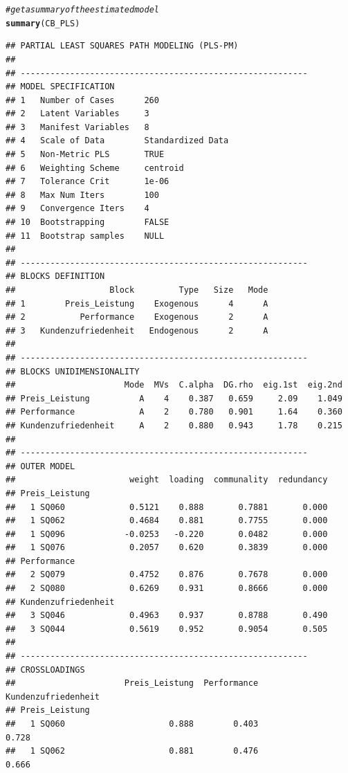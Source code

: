 \documentclass{article}\usepackage[]{graphicx}\usepackage[]{color}
\makeatletter
\newcommand{\hlcom}[1]{\textcolor[rgb]{0.678,0.584,0.686}{\textit{#1}}}%
\newcommand{\hlstd}[1]{\textcolor[rgb]{0.345,0.345,0.345}{#1}}%
\newcommand{\hlkwd}[1]{\textcolor[rgb]{0.737,0.353,0.396}{\textbf{#1}}}%
\newenvironment{kframe}{%
 \def\at@end@of@kframe{}%
 \ifinner\ifhmode%
  \def\at@end@of@kframe{\end{minipage}}%
  \begin{minipage}{\columnwidth}%
 \fi\fi%
 \def\FrameCommand##1{\hskip\@totalleftmargin \hskip-\fboxsep
 \colorbox{shadecolor}{##1}\hskip-\fboxsep
     \hskip-\linewidth \hskip-\@totalleftmargin \hskip\columnwidth}%
 \MakeFramed {\advance\hsize-\width
   \@totalleftmargin\z@ \linewidth\hsize
   \@setminipage}}%
 {\par\unskip\endMakeFramed%
 \at@end@of@kframe}
\newenvironment{knitrout}{}{} %
\makeatother
\begin{document}
\begin{knitrout}
\begin{kframe}
\begin{alltt}
\hlcom{#get a summary of the estimated model}
\hlkwd{summary}\hlstd{(CB_PLS)}
\end{alltt}
\begin{verbatim}
## PARTIAL LEAST SQUARES PATH MODELING (PLS-PM) 
## 
## ---------------------------------------------------------- 
## MODEL SPECIFICATION 
## 1   Number of Cases      260 
## 2   Latent Variables     3 
## 3   Manifest Variables   8 
## 4   Scale of Data        Standardized Data 
## 5   Non-Metric PLS       TRUE 
## 6   Weighting Scheme     centroid 
## 7   Tolerance Crit       1e-06 
## 8   Max Num Iters        100 
## 9   Convergence Iters    4 
## 10  Bootstrapping        FALSE 
## 11  Bootstrap samples    NULL 
## 
## ---------------------------------------------------------- 
## BLOCKS DEFINITION 
##                   Block         Type   Size   Mode
## 1        Preis_Leistung    Exogenous      4      A
## 2           Performance    Exogenous      2      A
## 3   Kundenzufriedenheit   Endogenous      2      A
## 
## ---------------------------------------------------------- 
## BLOCKS UNIDIMENSIONALITY 
##                      Mode  MVs  C.alpha  DG.rho  eig.1st  eig.2nd
## Preis_Leistung          A    4    0.387   0.659     2.09    1.049
## Performance             A    2    0.780   0.901     1.64    0.360
## Kundenzufriedenheit     A    2    0.880   0.943     1.78    0.215
## 
## ---------------------------------------------------------- 
## OUTER MODEL 
##                       weight  loading  communality  redundancy
## Preis_Leistung                                                
##   1 SQ060             0.5121    0.888       0.7881       0.000
##   1 SQ062             0.4684    0.881       0.7755       0.000
##   1 SQ096            -0.0253   -0.220       0.0482       0.000
##   1 SQ076             0.2057    0.620       0.3839       0.000
## Performance                                                   
##   2 SQ079             0.4752    0.876       0.7678       0.000
##   2 SQ080             0.6269    0.931       0.8666       0.000
## Kundenzufriedenheit                                           
##   3 SQ046             0.4963    0.937       0.8788       0.490
##   3 SQ044             0.5619    0.952       0.9054       0.505
## 
## ---------------------------------------------------------- 
## CROSSLOADINGS 
##                      Preis_Leistung  Performance  Kundenzufriedenheit
## Preis_Leistung                                                       
##   1 SQ060                     0.888        0.403                0.728
##   1 SQ062                     0.881        0.476                0.666

\end{verbatim}
\end{kframe}
\end{knitrout}
\end{document}
